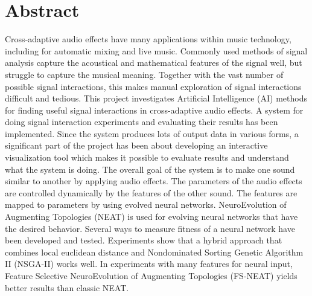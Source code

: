 \section*{Abstract}
Cross-adaptive audio effects have many applications within music technology, including for automatic mixing and live music. Commonly used methods of signal analysis capture the acoustical and mathematical features of the signal well, but struggle to capture the musical meaning. Together with the vast number of possible signal interactions, this makes manual exploration of signal interactions difficult and tedious. This project investigates Artificial Intelligence (AI) methods for finding useful signal interactions in cross-adaptive audio effects. A system for doing signal interaction experiments and evaluating their results has been implemented. Since the system produces lots of output data in various forms, a significant part of the project has been about developing an interactive visualization tool which makes it possible to evaluate results and understand what the system is doing. The overall goal of the system is to make one sound similar to another by applying audio effects. The parameters of the audio effects are controlled dynamically by the features of the other sound. The features are mapped to parameters by using evolved neural networks. NeuroEvolution of Augmenting Topologies (NEAT) is used for evolving neural networks that have the desired behavior. Several ways to measure fitness of a neural network have been developed and tested. Experiments show that a hybrid approach that combines local euclidean distance and Nondominated Sorting Genetic Algorithm II (NSGA-II) works well. In experiments with many features for neural input, Feature Selective NeuroEvolution of Augmenting Topologies (FS-NEAT) yields better results than classic NEAT.
